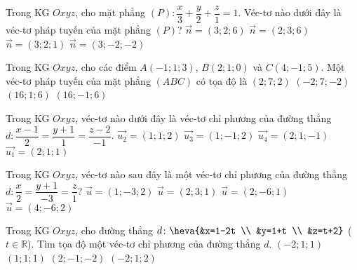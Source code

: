 \begin{ex}%
	Trong KG $Oxyz$, cho mặt phẳng $(P) \colon \dfrac{x}{3}+\dfrac{y}{2}+\dfrac{z}{1}=1$. Véc-tơ nào dưới đây là véc-tơ pháp tuyến của mặt phẳng $(P)$?
	\choice
	{$\overrightarrow{n}=(3;2;6)$}
	{\True $\overrightarrow{n}=(2;3;6)$}
	{$\overrightarrow{n}=(3;2;1)$}
	{$\overrightarrow{n}=(3;-2;-2)$}
\end{ex}

\begin{ex}%
	Trong KG $Oxyz$, cho các điểm $A(-1;1;3)$, $B(2;1;0)$ và $C(4;-1;5)$. Một véc-tơ pháp tuyến của mặt phẳng $(ABC)$ có tọa độ là
	\choice
	{\True $(2;7;2)$}
	{$(-2;7;-2)$}
	{$(16;1;6)$}
	{$(16;-1;6)$}
\end{ex}

\begin{ex}%
		Trong KG $Oxyz$, véc-tơ nào dưới đây là véc-tơ chỉ phương của đường thẳng $d \colon \dfrac{x-1}{2}=\dfrac{y+1}{1}=\dfrac{z-2}{-1}$.
	\choice
	{$\overrightarrow{u_2}=(1;1;2)$}
	{$\overrightarrow{u_3}=(1;-1;2)$}
	{\True $\overrightarrow{u_4}=(2;1;-1)$}
	{$\overrightarrow{u_1}=(2;1;1)$}
\end{ex}

\begin{ex}%
	Trong KG $Oxyz$, véc-tơ nào sau đây là một véc-tơ chỉ phương của đường thẳng $d \colon \dfrac{x}{2}=\dfrac{y+1}{-3}=\dfrac{z}{1}$?
	\choice
	{$\overrightarrow{u}=(1;-3;2)$}
	{$\overrightarrow{u}=(2;3;1)$}
	{$\overrightarrow{u}=(2;-6;1)$}
	{\True $\overrightarrow{u}=(4;-6;2)$}
\end{ex}

\begin{ex}%
	Trong KG $Oxyz$, cho đường thẳng $d \colon \heva{&x=1-2t \\ &y=1+t \\ &z=t+2}$ ($t\in \mathbb{R}$). Tìm tọa độ một véc-tơ chỉ phương của đường thẳng $d$.
	\choice
	{\True $(-2;1;1)$}
	{$(1;1;1)$}
	{$(2;-1;-2)$}
	{$(-2;1;2)$}
\end{ex}

